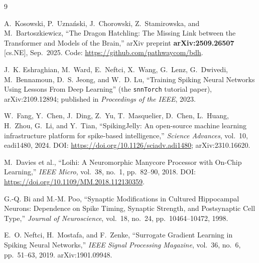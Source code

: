 \documentclass[11pt]{article}
\begin{document}
\begin{thebibliography}{9}

A.~Kosowski, P.~Uzna\'nski, J.~Chorowski, Z.~Stamirowska, and
M.~Bartoszkiewicz,
``The Dragon Hatchling: The Missing Link between the Transformer and Models
of the Brain,'' arXiv preprint \textbf{arXiv:2509.26507} [cs.NE], Sep.~2025.
Code: \url{https://github.com/pathwaycom/bdh}.

J.~K. Eshraghian, M.~Ward, E.~Neftci, X.~Wang, G.~Lenz, G.~Dwivedi,
M.~Bennamoun, D.~S. Jeong, and W.~D. Lu,
``Training Spiking Neural Networks Using Lessons From Deep Learning''
(the \texttt{snnTorch} tutorial paper),
arXiv:2109.12894; published in \emph{Proceedings of the IEEE}, 2023.

W.~Fang, Y.~Chen, J.~Ding, Z.~Yu, T.~Masquelier, D.~Chen, L.~Huang,
H.~Zhou, G.~Li, and Y.~Tian,
``SpikingJelly: An open-source machine learning infrastructure platform for
spike-based intelligence,'' \emph{Science Advances}, vol.~10, eadi1480, 2024.
DOI: \url{https://doi.org/10.1126/sciadv.adi1480}; arXiv:2310.16620.

M.~Davies et al.,
``Loihi: A Neuromorphic Manycore Processor with On-Chip Learning,''
\emph{IEEE Micro}, vol.~38, no.~1, pp.~82--90, 2018.
DOI: \url{https://doi.org/10.1109/MM.2018.112130359}.

G.-Q. Bi and M.-M. Poo,
``Synaptic Modifications in Cultured Hippocampal Neurons: Dependence on Spike
Timing, Synaptic Strength, and Postsynaptic Cell Type,''
\emph{Journal of Neuroscience}, vol.~18, no.~24, pp.~10464--10472, 1998.

E.~O. Neftci, H.~Mostafa, and F.~Zenke,
``Surrogate Gradient Learning in Spiking Neural Networks,''
\emph{IEEE Signal Processing Magazine}, vol.~36, no.~6, pp.~51--63, 2019.
arXiv:1901.09948.

\end{thebibliography}
\end{document}
